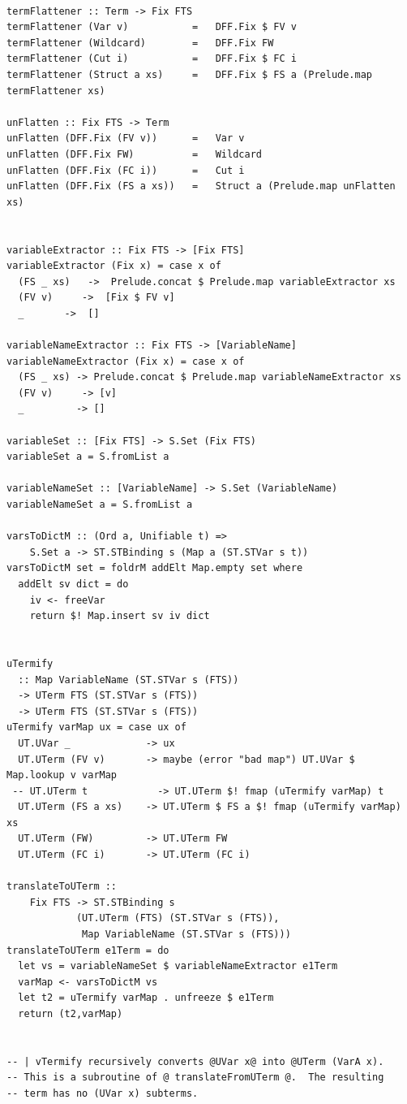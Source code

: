 \documentclass[thesis-solanki.tex]{subfiles}
\begin{document}
\begin{verbatim}

termFlattener :: Term -> Fix FTS
termFlattener (Var v)           =   DFF.Fix $ FV v
termFlattener (Wildcard)        =   DFF.Fix FW
termFlattener (Cut i)           =   DFF.Fix $ FC i
termFlattener (Struct a xs)     =   DFF.Fix $ FS a (Prelude.map termFlattener xs)

unFlatten :: Fix FTS -> Term
unFlatten (DFF.Fix (FV v))      =   Var v
unFlatten (DFF.Fix FW)          =   Wildcard
unFlatten (DFF.Fix (FC i))      =   Cut i
unFlatten (DFF.Fix (FS a xs))   =   Struct a (Prelude.map unFlatten xs)


variableExtractor :: Fix FTS -> [Fix FTS]
variableExtractor (Fix x) = case x of
  (FS _ xs)   ->  Prelude.concat $ Prelude.map variableExtractor xs
  (FV v)     ->  [Fix $ FV v]
  _       ->  []

variableNameExtractor :: Fix FTS -> [VariableName]
variableNameExtractor (Fix x) = case x of
  (FS _ xs) -> Prelude.concat $ Prelude.map variableNameExtractor xs
  (FV v)     -> [v]
  _         -> []

variableSet :: [Fix FTS] -> S.Set (Fix FTS)
variableSet a = S.fromList a

variableNameSet :: [VariableName] -> S.Set (VariableName)
variableNameSet a = S.fromList a

varsToDictM :: (Ord a, Unifiable t) =>
    S.Set a -> ST.STBinding s (Map a (ST.STVar s t))
varsToDictM set = foldrM addElt Map.empty set where
  addElt sv dict = do
    iv <- freeVar
    return $! Map.insert sv iv dict


uTermify
  :: Map VariableName (ST.STVar s (FTS))
  -> UTerm FTS (ST.STVar s (FTS))
  -> UTerm FTS (ST.STVar s (FTS))
uTermify varMap ux = case ux of
  UT.UVar _             -> ux
  UT.UTerm (FV v)       -> maybe (error "bad map") UT.UVar $ Map.lookup v varMap
 -- UT.UTerm t            -> UT.UTerm $! fmap (uTermify varMap) t
  UT.UTerm (FS a xs)    -> UT.UTerm $ FS a $! fmap (uTermify varMap) xs
  UT.UTerm (FW)         -> UT.UTerm FW
  UT.UTerm (FC i)       -> UT.UTerm (FC i)

translateToUTerm ::
    Fix FTS -> ST.STBinding s
            (UT.UTerm (FTS) (ST.STVar s (FTS)),
             Map VariableName (ST.STVar s (FTS)))
translateToUTerm e1Term = do
  let vs = variableNameSet $ variableNameExtractor e1Term
  varMap <- varsToDictM vs
  let t2 = uTermify varMap . unfreeze $ e1Term
  return (t2,varMap)


-- | vTermify recursively converts @UVar x@ into @UTerm (VarA x).
-- This is a subroutine of @ translateFromUTerm @.  The resulting
-- term has no (UVar x) subterms.


\end{verbatim}
\end{document}
